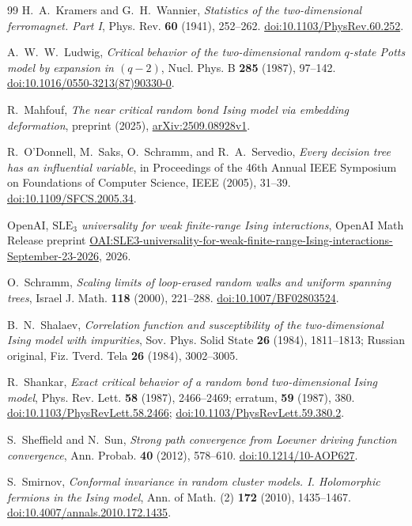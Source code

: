\begin{thebibliography}{99}
H.~A.~Kramers and G.~H.~Wannier,
\emph{Statistics of the two-dimensional ferromagnet. Part I},
Phys. Rev. \textbf{60} (1941), 252--262.
\href{https://doi.org/10.1103/PhysRev.60.252}{doi:10.1103/PhysRev.60.252}.

A.~W.~W.~Ludwig,
\emph{Critical behavior of the two-dimensional random $q$-state Potts model by expansion in $(q-2)$},
Nucl. Phys. B \textbf{285} (1987), 97--142.
\href{https://doi.org/10.1016/0550-3213(87)90330-0}{doi:10.1016/0550-3213(87)90330-0}.

R.~Mahfouf,
\emph{The near critical random bond Ising model via embedding deformation},
preprint (2025), \href{https://arxiv.org/abs/2509.08928v1}{arXiv:2509.08928v1}.

R.~O'Donnell, M.~Saks, O.~Schramm, and R.~A.~Servedio,
\emph{Every decision tree has an influential variable},
in Proceedings of the 46th Annual IEEE Symposium on Foundations of Computer Science,
IEEE (2005), 31--39.
\href{https://doi.org/10.1109/SFCS.2005.34}{doi:10.1109/SFCS.2005.34}.

OpenAI,
\emph{$\mathrm{SLE}_3$ universality for weak finite-range Ising interactions},
OpenAI Math Release preprint
\href{https://github.com/openai/math/blob/main/preprints/SLE3-universality-for-weak-finite-range-Ising-interactions-September-23-2026/paper.pdf}{OAI:SLE3-universality-for-weak-finite-range-Ising-interactions-September-23-2026},
2026.

O.~Schramm,
\emph{Scaling limits of loop-erased random walks and uniform spanning trees},
Israel J. Math. \textbf{118} (2000), 221--288.
\href{https://doi.org/10.1007/BF02803524}{doi:10.1007/BF02803524}.

B.~N.~Shalaev,
\emph{Correlation function and susceptibility of the two-dimensional Ising model with impurities},
Sov. Phys. Solid State \textbf{26} (1984), 1811--1813;
Russian original, Fiz. Tverd. Tela \textbf{26} (1984), 3002--3005.

R.~Shankar,
\emph{Exact critical behavior of a random bond two-dimensional Ising model},
Phys. Rev. Lett. \textbf{58} (1987), 2466--2469;
erratum, \textbf{59} (1987), 380.
\href{https://doi.org/10.1103/PhysRevLett.58.2466}{doi:10.1103/PhysRevLett.58.2466};
\href{https://doi.org/10.1103/PhysRevLett.59.380.2}{doi:10.1103/PhysRevLett.59.380.2}.

S.~Sheffield and N.~Sun,
\emph{Strong path convergence from Loewner driving function convergence},
Ann. Probab. \textbf{40} (2012), 578--610.
\href{https://doi.org/10.1214/10-AOP627}{doi:10.1214/10-AOP627}.

S.~Smirnov,
\emph{Conformal invariance in random cluster models. I. Holomorphic fermions in the Ising model},
Ann. of Math. (2) \textbf{172} (2010), 1435--1467.
\href{https://doi.org/10.4007/annals.2010.172.1435}{doi:10.4007/annals.2010.172.1435}.

\end{thebibliography}
